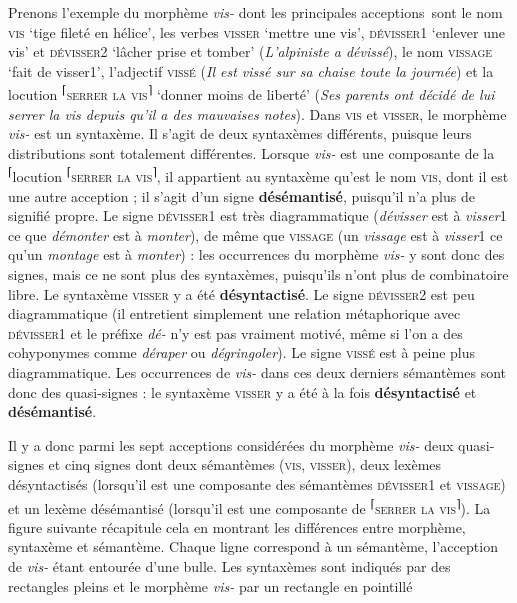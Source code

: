 Prenons l’exemple du morphème \textit{vis-} dont les principales acceptions~sont le nom \textsc{vis} ‘tige fileté en hélice’, les verbes \textsc{visser} ‘mettre une vis’, \textsc{dévisser1} ‘enlever une vis’ et \textsc{dévisser2} ‘lâcher prise et tomber’ (\textit{L’alpiniste a dévissé}), le nom \textsc{vissage} ‘fait de visser1’, l’adjectif \textsc{vissé} (\textit{Il est vissé sur sa chaise toute la journée}) et la locution \textsuperscript{⌈}\textsc{serrer} \textsc{la} \textsc{vis}\textsuperscript{⌉} ‘donner moins de liberté’ (\textit{Ses parents ont décidé de lui serrer la vis depuis qu’il a des mauvaises notes}). Dans \textsc{vis} et \textsc{visser}, le morphème \textit{vis-} est un syntaxème. Il s’agit de deux syntaxèmes différents, puisque leurs distributions sont totalement différentes. Lorsque \textit{vis-} est une composante de la \textsuperscript{⌈}locution \textsuperscript{⌈}\textsc{serrer} \textsc{la} \textsc{vis}\textsuperscript{⌉}, il appartient au syntaxème qu’est le nom \textsc{vis}, dont il est une autre acception ; il s’agit d’un signe \textbf{désémantisé}, puisqu’il n’a plus de signifié propre. Le signe \textsc{dévisser1} est très diagrammatique (\textit{dévisser} est à \textit{visser}1 ce que \textit{démonter} est à \textit{monter}), de même que \textsc{vissage} (un \textit{vissage} est à \textit{visser}1 ce qu’un \textit{montage} est à \textit{monter}) : les occurrences du morphème \textit{vis-} y sont donc des signes, mais ce ne sont plus des syntaxèmes, puisqu’ils n’ont plus de combinatoire libre. Le syntaxème \textsc{visser} y a été \textbf{désyntactisé}. Le signe \textsc{dévisser2} est peu diagrammatique (il entretient simplement une relation métaphorique avec \textsc{dévisser}1 et le préfixe \textit{dé-} n’y est pas vraiment motivé, même si l’on a des cohyponymes comme \textit{déraper} ou \textit{dégringoler}). Le signe \textsc{vissé} est à peine plus diagrammatique. Les occurrences de \textit{vis-} dans ces deux derniers sémantèmes sont donc des quasi-signes : le syntaxème \textsc{visser} y a été à la fois \textbf{désyntactisé} et \textbf{désémantisé}.

Il y a donc parmi les sept acceptions considérées du morphème \textit{vis-} deux quasi-signes et cinq signes dont deux sémantèmes (\textsc{vis,} \textsc{visser}), deux lexèmes désyntactisés (lorsqu’il est une composante des sémantèmes \textsc{dévisser1} et \textsc{vissage}) et un lexème désémantisé (lorsqu’il est une composante de \textsuperscript{⌈}\textsc{serrer} \textsc{la} \textsc{vis}\textsuperscript{⌉}). La figure suivante récapitule cela en montrant les différences entre morphème, syntaxème et sémantème. Chaque ligne correspond à un sémantème, l’acception de \textit{vis-} étant entourée d’une bulle. Les syntaxèmes sont indiqués par des rectangles pleins et le morphème \textit{vis-} par un rectangle en pointillé

